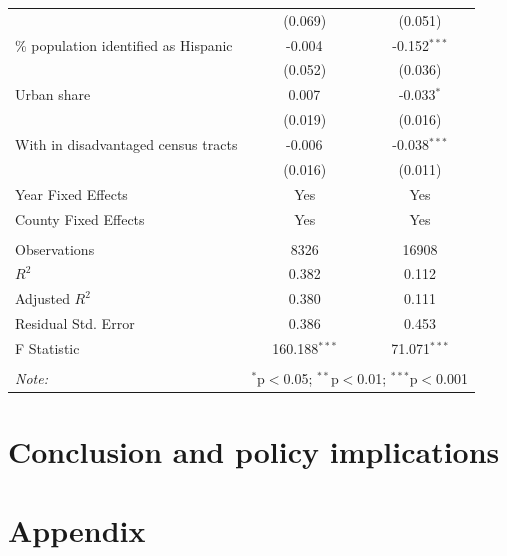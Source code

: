 \documentclass[12pt,twoside,letterpaper]{article}
\begin{document}
\begin{table}[!ht]
{\begin{tabular}{@{\extracolsep{5pt}}lcc}
& (0.069) & (0.051) \\
 \% population identified as Hispanic & -0.004$^{}$ & -0.152$^{***}$ \\
& (0.052) & (0.036) \\
 Urban share & 0.007$^{}$ & -0.033$^{*}$ \\
& (0.019) & (0.016) \\
 With in disadvantaged census tracts & -0.006$^{}$ & -0.038$^{***}$ \\
& (0.016) & (0.011) \\
 Year Fixed Effects & Yes & Yes \\
 County Fixed Effects & Yes & Yes \\
\hline \\[-1.8ex]
 Observations & 8326 & 16908 \\
 $R^2$ & 0.382 & 0.112 \\
 Adjusted $R^2$ & 0.380 & 0.111 \\
 Residual Std. Error & 0.386 & 0.453 \\
 F Statistic & 160.188$^{***}$ & 71.071$^{***}$ \\
\hline
\hline \\[-1.8ex]
\textit{Note:} & \multicolumn{2}{r}{$^{*}$p$<$0.05; $^{**}$p$<$0.01; $^{***}$p$<$0.001} \\
\end{tabular}}
\end{table}


\newpage
\section[Conclusion]{Conclusion and policy implications}



\newpage
\appendix
{}
\section[Appendix]{Appendix}
\end{document}
